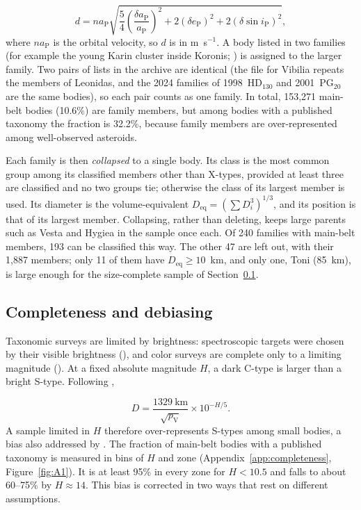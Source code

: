 \documentclass[twocolumn]{aastex701}
\begin{document}
\begin{equation}\label{eq:2}
d = n a_{\mathrm{P}} \sqrt{\frac{5}{4}\left(\frac{\delta a_{\mathrm{P}}}{a_{\mathrm{P}}}\right)^{2} + 2(\delta e_{\mathrm{P}})^{2} + 2(\delta \sin i_{\mathrm{P}})^{2}},
\end{equation}
where $n a_{\mathrm{P}}$ is the orbital velocity, so $d$ is in m~s$^{-1}$. A body listed in two families (for example the young Karin cluster inside Koronis; \citealt{nesvorny2002}) is assigned to the larger family. Two pairs of lists in the archive are identical (the file for Vibilia repeats the members of Leonidas, and the 2024 families of 1998~HD$_{130}$ and 2001~PG$_{20}$ are the same bodies), so each pair counts as one family. In total, 153,271 main-belt bodies (10.6\%) are family members, but among bodies with a published taxonomy the fraction is 32.2\%, because family members are over-represented among well-observed asteroids.

Each family is then \textit{collapsed} to a single body. Its class is the most common group among its classified members other than X-types, provided at least three are classified and no two groups tie; otherwise the class of its largest member is used. Its diameter is the volume-equivalent $D_{\mathrm{eq}} = (\sum D_i^{3})^{1/3}$, and its position is that of its largest member. Collapsing, rather than deleting, keeps large parents such as Vesta and Hygiea in the sample once each. Of 240 families with main-belt members, 193 can be classified this way. The other 47 are left out, with their 1,887 members; only 11 of them have $D_{\mathrm{eq}} \geq 10$~km, and only one, Toni (85~km), is large enough for the size-complete sample of Section~\ref{sec:3.4}.

\subsection{Completeness and debiasing}\label{sec:3.4}
Taxonomic surveys are limited by brightness: spectroscopic targets were chosen by their visible brightness (\citealt{mainzer2011b}), and color surveys are complete only to a limiting magnitude (\citealt{sergeyev2022}). At a fixed absolute magnitude $H$, a dark C-type is larger than a bright S-type. Following \citet{pravec2007},

\begin{equation}\label{eq:3}
D = \frac{1329\ \mathrm{km}}{\sqrt{p_{\mathrm{V}}}} \times 10^{-H/5}.
\end{equation}
A sample limited in $H$ therefore over-represents S-types among small bodies, a bias also addressed by \citet{demeo2013}. The fraction of main-belt bodies with a published taxonomy is measured in bins of $H$ and zone (Appendix~\ref{app:completeness}, Figure~\ref{fig:A1}). It is at least 95\% in every zone for $H < 10.5$ and falls to about 60–75\% by $H \approx 14$. This bias is corrected in two ways that rest on different assumptions.
\end{document}
